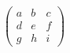 


\[
\left(
\begin{array}{ccc}
  a & b & c \\
  d & e & f \\
  g & h & i
\end{array}
\right)
\]




